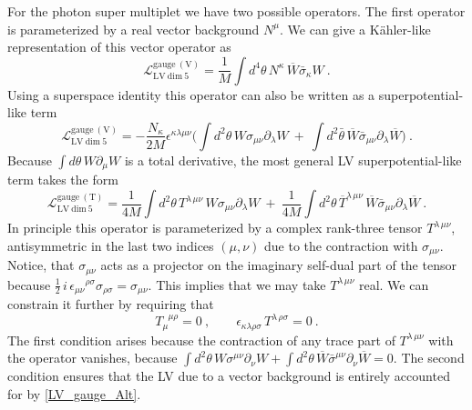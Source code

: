 \documentclass[12pt]{revtex4}
\begin{document}
For the photon super multiplet we have two possible operators. The
first operator is parameterized by a real vector background $N^\mu$.
We can give a K\"ahler-like representation of this vector operator as 
\begin{equation}
\label{LV_gauge}
\mathcal{L}_{\mathrm{LV\ dim\ 5}}^{\mathrm{gauge\ (V)}} = 
\frac 1M \int d^4\theta \, 
N^\kappa\, \overline{W} \bar{\sigma}_\kappa W~.   
\end{equation}
Using a superspace identity this operator can also be written as a
superpotential-like term  
\begin{equation}
\label{LV_gauge_Alt}
\mathcal{L}_{\mathrm{LV\ dim\ 5}}^{\mathrm{gauge\ (V)}} = 
- \frac {N_\kappa}{2 M} \epsilon^{\kappa\lambda\mu\nu} 
\Big( 
\int d^2\theta\, W \sigma_{\mu\nu} \partial_\lambda W ~+~
\int d^2\bar{\theta}\, \overline{W} \bar{\sigma}_{\mu\nu}
\partial_\lambda \overline{W} 
\Big)~.
\end{equation} 
Because $\int d\theta\, W\partial_\mu W$ is a total derivative, 
the most general LV superpotential-like term takes the form 
\begin{equation}
\label{LV_gauge_Tterm}
\mathcal{L}_{\mathrm{LV\ dim\ 5}}^{\mathrm{gauge\ (T)}} =
\frac 1{4M} 
\int d^2\theta \, T^{\lambda\, \mu\nu} \,
        W \sigma_{\mu\nu} \partial_\lambda W  
~+~ \frac 1{4M} 
\int d^2\theta \, \overline{T}^{\lambda\, \mu\nu} \,
        \overline{W} \bar{\sigma}_{\mu\nu} \partial_\lambda\overline{W}  
~.
\end{equation}
In principle this operator is parameterized by a complex rank-three
tensor $T^{\lambda\,\mu\nu}$, antisymmetric in the last two indices
$(\mu,\nu)$ due to the contraction with $\sigma_{\mu\nu}$. Notice, that
$\sigma_{\mu\nu}$ acts as a projector on the imaginary self-dual part
of the tensor because 
\(
\frac{1}{2}\,i\,\epsilon_{\mu\nu}{}^{\rho\sigma}
\sigma_{\rho\sigma} = \sigma_{\mu\nu}. 
\)
This implies that we may take $T^{\lambda\,\mu\nu}$ real. We can
constrain it further by requiring that 
\begin{equation}
T_\mu^{\phantom{\mu}\mu\rho} = 0~,
 \qquad 
\epsilon_{\kappa\lambda\rho\sigma}\, T^{\lambda\,\rho\sigma}  =  0~.
\end{equation} 
The first condition arises because the contraction of any trace part of
$T^{\lambda\,\mu\nu}$ with the operator vanishes, because 
\(
\int d^2\theta \, W\sigma^{\mu\nu} \partial_\nu W + 
\int d^2\theta \, \overline{W} \bar\sigma^{\mu\nu} \partial_\nu
\overline{W} = 0. 
\)
The second condition ensures that the LV due to a vector 
background is entirely accounted for by \eqref{LV_gauge_Alt}.
\end{document}
